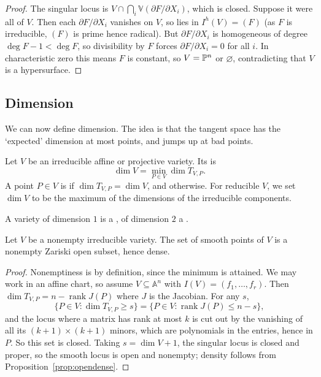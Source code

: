 \documentclass[a4paper]{scrartcl}
\newcommand{\A}{\mathbb{A}}
\newcommand{\V}{\mathbb{V}}
\DeclareMathOperator{\rk}{rank}
\begin{document}
\begin{proof}
	The singular locus is $V \cap \bigcap_i \V(\partial F/\partial X_i)$, which is closed. Suppose it were all of $V$. Then each $\partial F/\partial X_i$ vanishes on $V$, so lies in $I^h(V) = (F)$ (as $F$ is irreducible, $(F)$ is prime hence radical). But $\partial F/\partial X_i$ is homogeneous of degree $\deg F - 1 < \deg F$, so divisibility by $F$ forces $\partial F/\partial X_i = 0$ for all $i$. In characteristic zero this means $F$ is constant, so $V = \mathbb{P}^n$ or $\varnothing$, contradicting that $V$ is a hypersurface.
\end{proof}

\subsection{Dimension}

We can now define dimension. The idea is that the tangent space has the `expected' dimension at most points, and jumps up at bad points.

\begin{definition}[Dimension]
	Let $V$ be an irreducible affine or projective variety. Its  is
	$$\dim V = \min_{P \in V} \dim T_{V,P}.$$
	A point $P \in V$ is  if $\dim T_{V,P} = \dim V$, and  otherwise. For reducible $V$, we set $\dim V$ to be the maximum of the dimensions of the irreducible components.
\end{definition}

A variety of dimension $1$ is a , of dimension $2$ a .

\begin{theorem}\label{thm:smoothopen}
	Let $V$ be a nonempty irreducible variety. The set of smooth points of $V$ is a nonempty Zariski open subset, hence dense.
\end{theorem}

\begin{proof}
	Nonemptiness is by definition, since the minimum is attained. We may work in an affine chart, so assume $V \subseteq \A^n$ with $I(V) = (f_1,\dots,f_r)$. Then $\dim T_{V,P} = n - \rk J(P)$ where $J$ is the Jacobian. For any $s$,
	$$\{P \in V : \dim T_{V,P} \geq s\} = \{P \in V : \rk J(P) \leq n - s\},$$
	and the locus where a matrix has rank at most $k$ is cut out by the vanishing of all its $(k+1)\times(k+1)$ minors, which are polynomials in the entries, hence in $P$. So this set is closed. Taking $s = \dim V + 1$, the singular locus is closed and proper, so the smooth locus is open and nonempty; density follows from Proposition~\ref{prop:opendense}.
\end{proof}
\end{document}
